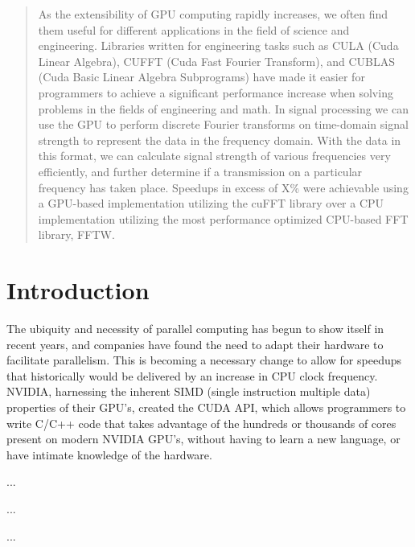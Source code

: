 \documentclass[conference]{IEEEtran}
\begin{document}
\maketitle


\begin{abstract}


As the extensibility of GPU computing rapidly increases, we often find them useful
 for different applications in the field of science and engineering. Libraries
 written for engineering tasks such as CULA (Cuda Linear Algebra), CUFFT (Cuda 
 Fast Fourier Transform), and CUBLAS (Cuda Basic Linear Algebra Subprograms) have
 made it easier for programmers to achieve a significant performance increase when
 solving problems in the fields of engineering and math. In signal processing we can
 use the GPU to perform discrete Fourier transforms on time-domain signal strength
 to represent the data in the frequency domain. With the data in this format, we can 
 calculate signal strength of various frequencies very efficiently, and further determine
 if a transmission on a particular frequency has taken place. Speedups in excess of X\%
 were achievable using a GPU-based implementation utilizing the cuFFT library over a CPU
 implementation utilizing the most performance optimized CPU-based FFT library, FFTW.

\end{abstract}

\IEEEpeerreviewmaketitle

\section{Introduction}

The ubiquity and necessity of parallel computing has begun to show itself
in recent years, and companies have found the need to adapt their hardware to
facilitate parallelism. This is becoming a necessary change to allow for
speedups that historically would be delivered by an increase in CPU clock
frequency. NVIDIA, harnessing the inherent SIMD (single instruction multiple data)
properties of their GPU's, created the CUDA API, which allows programmers
to write C/C++ code that takes advantage of the hundreds or thousands of 
cores present on modern NVIDIA GPU's, without having to learn a new language,
or have intimate knowledge of the hardware. 

...

...

...
\end{document}
